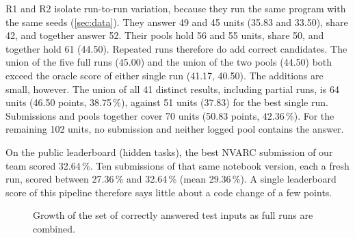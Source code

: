 \documentclass[11pt]{article}
\newcommand{\R}[1]{R#1}
\begin{document}
\R{1} and \R{2} isolate run-to-run variation, because they run the same program with the same seeds (\cref{sec:data}). They answer 49 and 45 units (35.83 and 33.50), share 42, and together answer 52.
Their pools hold 56 and 55 units, share 50, and together hold 61 (44.50).
Repeated runs therefore do add correct candidates. The union of the five full runs (45.00) and the union of the two pools (44.50) both exceed the oracle score of either single run (41.17, 40.50).
The additions are small, however.
The union of all 41 distinct results, including partial runs, is 64 units (46.50 points, 38.75\,\%), against 51 units (37.83) for the best single run.
Submissions and pools together cover 70 units (50.83 points, 42.36\,\%). For the remaining 102 units, no submission and neither logged pool contains the answer.

On the public leaderboard (hidden tasks), the best NVARC submission of our team scored 32.64\,\%. Ten submissions of that same notebook version, each a fresh run, scored between 27.36\,\% and 32.64\,\% (mean 29.36\,\%).
A single leaderboard score of this pipeline therefore says little about a code change of a few points.

\begin{figure}[t]
\centering
{}
\caption{Growth of the set of correctly answered test inputs as full runs are combined.}
\label{fig:union}
\end{figure}
\end{document}
